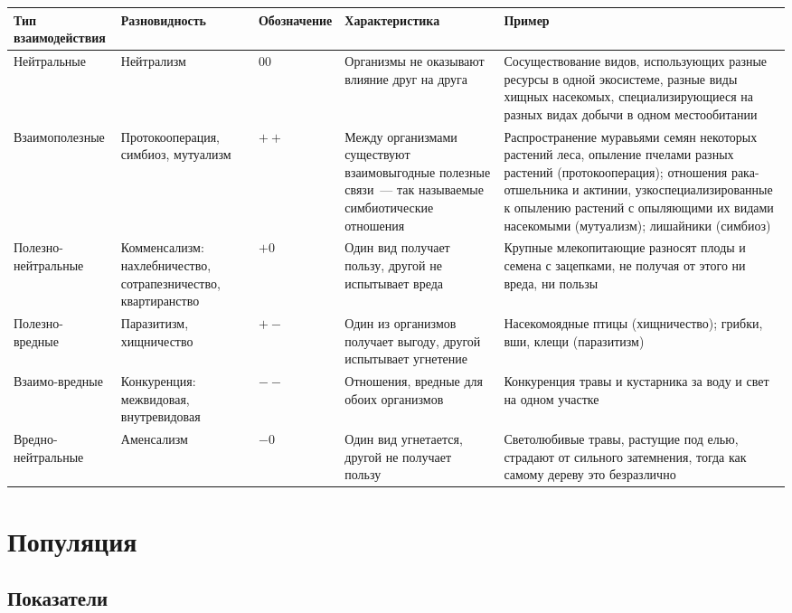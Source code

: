 \documentclass[12pt]{article}
\begin{document}
	\begin{xltabular}{\textwidth}{|X|X|X|X|X|}
		\hline
		\textbf{Тип взаимодействия} & \textbf{Разновидность} & \textbf{Обозначение} & \textbf{Характеристика} & \textbf{Пример}\\
		\hline
		Нейтральные & Нейтрализм & $00$ & Организмы не оказывают влияние друг на друга & Сосуществование видов, использующих разные ресурсы в одной экосистеме, разные виды хищных насекомых, специализирующиеся на разных видах добычи в одном местообитании\\
		\hline
		Взаимополезные & Протокооперация, симбиоз, мутуализм & $++$ & Между организмами существуют взаимовыгодные полезные связи~--- так называемые симбиотические отношения & Распространение муравьями семян некоторых растений леса, опыление пчелами разных растений (протокооперация); отношения рака-отшельника и актинии, узкоспециализированные к опылению растений с опыляющими их видами насекомыми (мутуализм); лишайники (симбиоз)\\
		\hline
		Полезно-нейтральные & Комменсализм: нахлебничество, сотрапезничество, квартиранство & $+0$ & Один вид получает пользу, другой не испытывает вреда & Крупные млекопитающие разносят плоды и семена с зацепками, не получая от этого ни вреда, ни пользы\\
		\hline
		Полезно-вредные & Паразитизм, хищничество & $+-$ & Один из организмов получает выгоду, другой испытывает угнетение & Насекомоядные птицы (хищничество); грибки, вши, клещи (паразитизм)\\
		\hline
		Взаимо-вредные & Конкуренция: межвидовая, внутревидовая & $--$ & Отношения, вредные для обоих организмов & Конкуренция травы и кустарника за воду и свет на одном участке\\
		\hline
		Вредно-нейтральные & Аменсализм & $-0$ & Один вид угнетается, другой не получает пользу & Светолюбивые травы, растущие под елью, страдают от сильного затемнения, тогда как самому дереву это безразлично\\
		\hline
	\end{xltabular}
	\newpage
	
	\section{Популяция}
	
	\subsection{Показатели}
	
\end{document}
